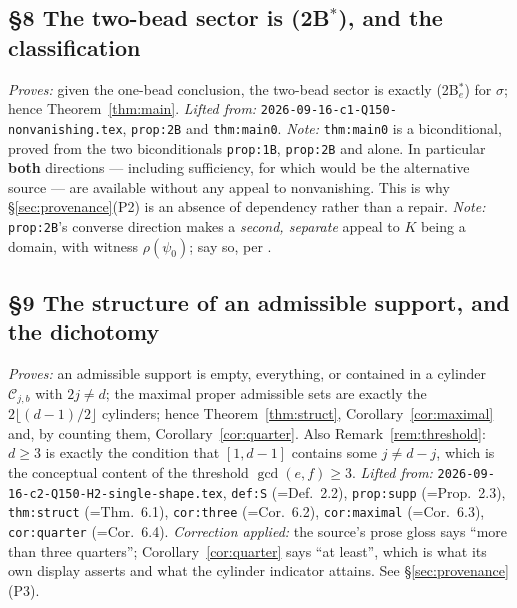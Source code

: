 \documentclass[11pt]{article}
\theoremstyle{definition}
\theoremstyle{remark}
\newcommand{\Cyl}{\mathcal{C}}           %
\begin{document}
\subsection*{\S8 The two-bead sector is (2B$^{*}$), and the classification}
\emph{Proves:} given the one-bead conclusion, the two-bead sector is exactly
(2B$^{*}_e$) for $\sigma$; hence Theorem~\ref{thm:main}.
\emph{Lifted from:} \texttt{2026-09-16-c1-Q150-nonvanishing.tex}, \texttt{prop:2B} and
\texttt{thm:main0}.
\emph{Note:} \texttt{thm:main0} is a biconditional, proved from the two biconditionals
\texttt{prop:1B}, \texttt{prop:2B} and \cite[\texttt{lem:sectors}]{Q149} alone.  In particular
\textbf{both} directions --- including sufficiency, for which \cite[\texttt{prop:suff}]{Q149}
would be the alternative source --- are available without any appeal to nonvanishing.  This is
why \S\ref{sec:provenance}(P2) is an absence of dependency rather than a repair.
\emph{Note:} \texttt{prop:2B}'s converse direction makes a \emph{second, separate} appeal to
$K$ being a domain, with witness $\rho(\psi_0)$; say so, per
\cite[one-domain-appeal]{memo}.

\subsection*{\S9 The structure of an admissible support, and the dichotomy}
\emph{Proves:} an admissible support is empty, everything, or contained in a cylinder
$\Cyl_{j,b}$ with $2j\ne d$; the maximal proper admissible sets are exactly the
$2\lfloor(d-1)/2\rfloor$ cylinders; hence Theorem~\ref{thm:struct},
Corollary~\ref{cor:maximal} and, by counting them, Corollary~\ref{cor:quarter}.  Also
Remark~\ref{rem:threshold}: $d\ge3$ is exactly the condition that $[1,d-1]$ contains some
$j\ne d-j$, which is the conceptual content of the threshold $\gcd(e,f)\ge3$.
\emph{Lifted from:} \texttt{2026-09-16-c2-Q150-H2-single-shape.tex}, \texttt{def:S}
(=Def.~2.2), \texttt{prop:supp} (=Prop.~2.3), \texttt{thm:struct} (=Thm.~6.1),
\texttt{cor:three} (=Cor.~6.2), \texttt{cor:maximal} (=Cor.~6.3), \texttt{cor:quarter}
(=Cor.~6.4).
\emph{Correction applied:} the source's prose gloss says ``more than three quarters'';
Corollary~\ref{cor:quarter} says ``at least'', which is what its own display asserts and what
the cylinder indicator attains.  See \S\ref{sec:provenance}(P3).
\end{document}
